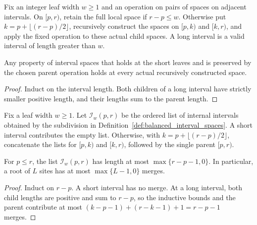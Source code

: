 \begin{definition}
    \label{def:balanced_interval_spaces}
    \leanok
    Fix an integer leaf width $w\ge1$ and an operation on pairs of spaces
    on adjacent intervals. On $[p,r)$, retain the full local space if
    $r-p\le w$. Otherwise put $k=p+\lfloor(r-p)/2\rfloor$, recursively
    construct the spaces on $[p,k)$ and $[k,r)$, and apply the fixed
    operation to these actual child spaces. A long interval is a valid
    interval of length greater than $w$.
\end{definition}

\begin{lemma}
    \label{lem:balanced_interval_invariant}
    \leanok
    Any property of interval spaces that holds at the short leaves and
    is preserved by the chosen parent operation holds at every actual
    recursively constructed space.
\end{lemma}
\begin{proof}\leanok
    Induct on the interval length. Both children of a long interval have
    strictly smaller positive length, and their lengths sum to the
    parent length.
\end{proof}

\begin{definition}
    \label{def:balanced_interval_merge_list}
    \leanok
    Fix a leaf width $w\ge1$. Let $\mathcal I_w(p,r)$ be the ordered
    list of internal intervals obtained by the subdivision in
    Definition~\ref{def:balanced_interval_spaces}. A short interval
    contributes the empty list. Otherwise, with
    $k=p+\lfloor(r-p)/2\rfloor$, concatenate the lists for $[p,k)$ and
    $[k,r)$, followed by the single parent $[p,r)$.
\end{definition}

\begin{lemma}
    \label{lem:balanced_interval_merge_count}
    \leanok
    For $p\le r$, the list $\mathcal I_w(p,r)$ has length at most
    $\max\{r-p-1,0\}$. In particular, a root of $L$ sites has at most
    $\max\{L-1,0\}$ merges.
\end{lemma}
\begin{proof}\leanok
    Induct on $r-p$. A short interval has no merge. At a long interval,
    both child lengths are positive and sum to $r-p$, so the inductive
    bounds and the parent contribute at most
    $(k-p-1)+(r-k-1)+1=r-p-1$ merges.
\end{proof}

